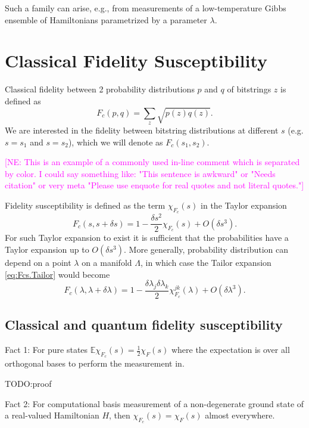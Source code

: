 \documentclass[american,aps,pra,reprint,floatfix,nofootinbib,superscriptaddress]{revtex4-2}
\newcommand{\NE}[1]{\textcolor{magenta}{[NE: #1]}}
\begin{document}
Such a family can arise, e.g., from measurements of a low-temperature
Gibbs ensemble of Hamiltonians parametrized by a parameter $\lambda$.

\section{Classical Fidelity Susceptibility}
Classical fidelity between 2 probability distributions $p$ and $q$ of
bitstrings $z$ is defined as
\begin{equation}
  F_c(p, q) = \sum_{z} \sqrt{p(z) q(z)}.
\end{equation}
We are interested in the fidelity between bitstring distributions at different
$s$ (e.g. $s=s_1$ and $s=s_2$), which we will denote as $F_c(s_1, s_2)$.

\NE{This is an example of a commonly used in-line comment which is separated by color. I could say something like: "This sentence is awkward" or "Needs citation" or very meta "Please use enquote for real quotes and not literal quotes."}

Fidelity susceptibility is defined as the term $\chi_{F_c}(s)$ in the Taylor
expansion
\begin{equation}
\label{eq:Fcs.Tailor}
  F_c(s, s+\delta s) = 1 - \frac{\delta s^2}{2} \chi_{F_c}(s) + O(\delta s^3).
\end{equation}
For such Taylor expansion to exist it is sufficient that the probabilities have
a Taylor expansion up to $O(\delta s^3)$. More generally, probability
distribution can depend on a point $\lambda$ on a manifold $\Lambda$,
in which case the Tailor expansion \eqref{eq:Fcs.Tailor} would become
\begin{equation}
\label{eq:Fcl.Tailor}
  F_c(\lambda, \lambda+\delta \lambda) = 1 - \frac{\delta \lambda_{j} \delta \lambda_k}{2} \chi_{F_c}^{jk}(\lambda) + O(\delta \lambda^3).
\end{equation}

\subsection{Classical and quantum fidelity susceptibility}
Fact 1: For pure states $\mathbb{E}\chi_{F_c} (s) = \frac12 \chi_F (s)$
where the expectation is over all orthogonal bases to perform the measurement in.

TODO:proof

Fact 2: For computational basis measurement of a non-degenerate ground state
of a real-valued Hamiltonian $H$, then $\chi_{F_c}(s) = \chi_F(s)$
almost everywhere.
\end{document}
